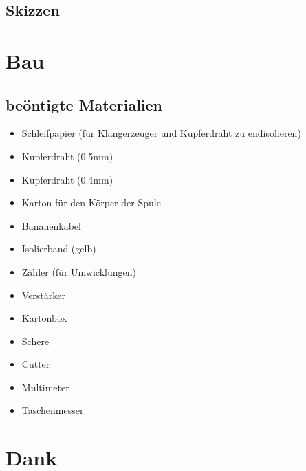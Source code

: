 \documentclass[a4paper,11pt]{report}
\begin{document}
\section{Skizzen}

\chapter{Bau}
\section{beöntigte Materialien}
\begin{multicols}{2}
    \begin{itemize}[parsep=0pt]
        \item Schleifpapier (für Klangerzeuger und Kupferdraht zu endisolieren)
        \item Kupferdraht (0.5mm)
        \item Kupferdraht (0.4mm)
        \item Karton für den Körper der Spule
        \item Bananenkabel
        \item Isolierband (gelb)
        \item Zähler (für Umwicklungen)
        \item Verstärker
        \item Kartonbox
        \item Schere
        \item Cutter
        \item Multimeter
        \item Taschenmesser
    \end{itemize}
\end{multicols}

\chapter*{Dank}



\newpage
\listoffigures

\newpage


\end{document}
